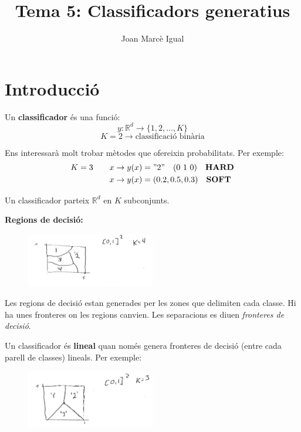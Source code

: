 \documentclass[a4paper]{article}
\title{Tema 5: Classificadors generatius}
\author{Joan Marcè Igual}
\begin{document}
	
\maketitle

\section{Introducció}

Un \textbf{classificador} és una funció:
$$
y:\mathbb{R}^d \rightarrow \{ 1,2,...,K \}
$$
$$
K = 2 \rightarrow \text{classificació binària}
$$

Ens interessarà molt trobar mètodes que ofereixin probabilitats. Per exemple:
\begin{align*}
	K = 3 \qquad &x \rightarrow y(x) = "2" \quad (0\ 1\ 0) \quad \text{\textbf{HARD}}\\
	& x \rightarrow y(x) = (0.2, 0.5, 0.3) \quad \text{\textbf{SOFT}}
\end{align*}

Un classificador parteix $\mathbb{R}^d$ en $K$ subconjunts. 

\textbf{Regions de decisió:}

\begin{figure}[H]
	\centering
	\includegraphics[width=0.5\textwidth]{images/tema_5-1}
\end{figure}

Les regions de decisió estan generades per les zones que delimiten cada classe. Hi ha unes fronteres on les regions canvien. Les separacions es diuen \emph{fronteres de decisió}.

Un classificador és \textbf{lineal} quan només genera fronteres de decisió (entre cada parell de classes) lineals. Per exemple:

\begin{figure}[H]
	\centering
	\includegraphics[width=0.5\textwidth]{images/tema_5-2}
\end{figure}
\end{document}
